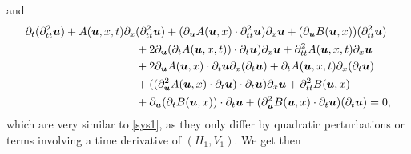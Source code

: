 and
\begin{align}
\label{V3}
\partial_{t}(\partial_{tt}^{2}\boldsymbol{u})+A(\boldsymbol{u},x,t)\partial_{x}&(\partial_{tt}^{2}\boldsymbol{u})
+(\partial_{\boldsymbol{u}}A(\boldsymbol{u},x)\cdot\partial_{tt}^{2}\boldsymbol{u})\partial_{x}\boldsymbol{u}
+(\partial_{\boldsymbol{u}}B(\boldsymbol{u},x))(\partial_{tt}^{2}\boldsymbol{u})\\
\notag&+2\partial_{\boldsymbol{u}}(\partial_{t}A(\boldsymbol{u},x,t))\cdot\partial_{t}\boldsymbol{u})\partial_{x}\boldsymbol{u}+\partial_{tt}^{2}A(\boldsymbol{u},x,t)\partial_{x}\boldsymbol{u}\\
\notag&+2\partial_{\boldsymbol{u}}A(\boldsymbol{u},x)\cdot\partial_{t}\boldsymbol{u}\partial_{x}(\partial_{t}\boldsymbol{u})+\partial_{t}A(\boldsymbol{u},x,t)\partial_{x}(\partial_{t}\boldsymbol{u})\\
\notag&+((\partial^{2}_{\boldsymbol{u}}A(\boldsymbol{u},x)\cdot\partial_{t}\boldsymbol{u})\cdot\partial_{t}\boldsymbol{u})\partial_{x}\boldsymbol{u}+\partial_{tt}^{2}B(\boldsymbol{u},x)\\
\notag&+\partial_{\boldsymbol{u}}(\partial_{t}B(\boldsymbol{u},x))\cdot\partial_{t}\boldsymbol{u}
+(\partial^{2}_{\boldsymbol{u}}B(\boldsymbol{u},x)\cdot\partial_{t}\boldsymbol{u})(\partial_{t}\boldsymbol{u})=0,
\end{align}
which are very similar to \eqref{sys1}, as they only differ by quadratic perturbations or terms involving a time derivative of $(H_{1},V_{1})$.
We get then
